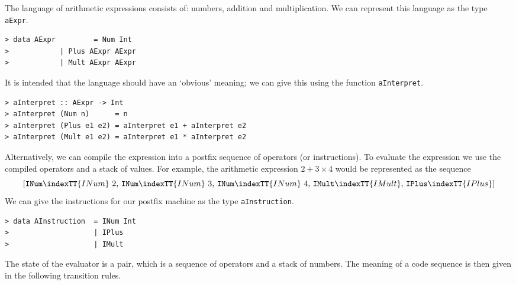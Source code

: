 The language of arithmetic expressions consists of: numbers, addition
and multiplication.  We can represent this language as the type
\mbox{\tt aExpr}.
\begin{verbatim}
> data AExpr         = Num Int
>            | Plus AExpr AExpr
>            | Mult AExpr AExpr
\end{verbatim}
%
%
%
It is intended that the language should have an `obvious' meaning;
we can give this using the function \mbox{\tt aInterpret}.
\begin{verbatim}
> aInterpret :: AExpr -> Int
> aInterpret (Num n)      = n
> aInterpret (Plus e1 e2) = aInterpret e1 + aInterpret e2
> aInterpret (Mult e1 e2) = aInterpret e1 * aInterpret e2
\end{verbatim}
%
%
%
%
Alternatively, we can compile the expression into a postfix sequence
of operators (or instructions). To evaluate the expression we use the
compiled operators and a stack of values. For example, the arithmetic
expression $2+3\times 4$ would be represented as the sequence
\[
[\mbox{\tt INum}\indexTT{INum}~2,\,\mbox{\tt INum}\indexTT{INum}~3,\,\mbox{\tt INum}\indexTT{INum}~4,\,\mbox{\tt IMult}\indexTT{IMult},\,\mbox{\tt IPlus}\indexTT{IPlus}]
\]
We can give the instructions for our postfix machine as the type
\mbox{\tt aInstruction}.
\begin{verbatim}
> data AInstruction  = INum Int
>                    | IPlus
>                    | IMult
\end{verbatim}
%
%
%
\par
The state of the evaluator is a pair, which is a sequence of operators
and a stack of numbers. The meaning of a code sequence is then given
in the following transition rules.


